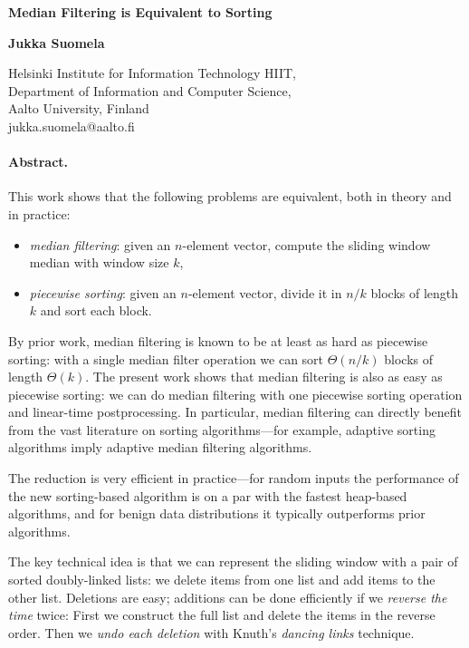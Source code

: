 \documentclass[a4paper,11pt]{article}
\begin{document}
\begin{flushleft}
{\huge\bf Median Filtering is Equivalent to Sorting \par}
\bigskip
\bigskip
\textbf{Jukka Suomela}

Helsinki Institute for Information Technology HIIT,\\
Department of Information and Computer Science, \\ Aalto University, Finland \\
jukka.suomela@aalto.fi
\end{flushleft}

\bigskip
\paragraph{Abstract.}

This work shows that the following problems are equivalent, both in theory and in practice:
\begin{itemize}
    \item \emph{median filtering}: given an $n$-element vector, compute the sliding window median with window size $k$,
    \item \emph{piecewise sorting}: given an $n$-element vector, divide it in $n/k$ blocks of length $k$ and sort each block.
\end{itemize}
By prior work, median filtering is known to be at least as hard as piecewise sorting: with a single median filter operation we can sort $\Theta(n/k)$ blocks of length $\Theta(k)$. The present work shows that median filtering is also as easy as piecewise sorting: we can do median filtering with one piecewise sorting operation and linear-time postprocessing. In particular, median filtering can directly benefit from the vast literature on sorting algorithms---for example, adaptive sorting algorithms imply adaptive median filtering algorithms. 

The reduction is very efficient in practice---for random inputs the performance of the new sorting-based algorithm is on a par with the fastest heap-based algorithms, and for benign data distributions it typically outperforms prior algorithms.

The key technical idea is that we can represent the sliding window with a pair of sorted doubly-linked lists: we delete items from one list and add items to the other list. Deletions are easy; additions can be done efficiently if we \emph{reverse the time} twice: First we construct the full list and delete the items in the reverse order. Then we \emph{undo each deletion} with Knuth's \emph{dancing links} technique.
\end{document}
